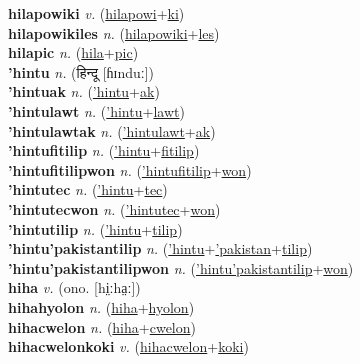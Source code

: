 \textbf{hilapowiki} \textit{v.} (\hyperref[hilapowi]{hilapowi}+\hyperref[ki]{ki})
 \label{hilapowiki} \\
\textbf{hilapowikiles} \textit{n.} (\hyperref[hilapowiki]{hilapowiki}+\hyperref[les]{les})
 \label{hilapowikiles} \\
\textbf{hilapic} \textit{n.} (\hyperref[hila]{hila}+\hyperref[pic]{pic})
 \label{hilapic} \\
\textbf{'hintu} \textit{n.} ({\devanagari{}हिन्दू} [ɦɪnduː])
 \label{'hintu} \\
\textbf{'hintuak} \textit{n.} (\hyperref['hintu]{'hintu}+\hyperref[ak]{ak})
 \label{'hintuak} \\
\textbf{'hintulawt} \textit{n.} (\hyperref['hintu]{'hintu}+\hyperref[lawt]{lawt})
 \label{'hintulawt} \\
\textbf{'hintulawtak} \textit{n.} (\hyperref['hintulawt]{'hintulawt}+\hyperref[ak]{ak})
 \label{'hintulawtak} \\
\textbf{'hintufitilip} \textit{n.} (\hyperref['hintu]{'hintu}+\hyperref[fitilip]{fitilip})
 \label{'hintufitilip} \\
\textbf{'hintufitilipwon} \textit{n.} (\hyperref['hintufitilip]{'hintufitilip}+\hyperref[won]{won})
 \label{'hintufitilipwon} \\
\textbf{'hintutec} \textit{n.} (\hyperref['hintu]{'hintu}+\hyperref[tec]{tec})
 \label{'hintutec} \\
\textbf{'hintutecwon} \textit{n.} (\hyperref['hintutec]{'hintutec}+\hyperref[won]{won})
 \label{'hintutecwon} \\
\textbf{'hintutilip} \textit{n.} (\hyperref['hintu]{'hintu}+\hyperref[tilip]{tilip})
 \label{'hintutilip} \\
\textbf{'hintu'pakistantilip} \textit{n.} (\hyperref['hintu]{'hintu}+\hyperref['pakistan]{'pakistan}+\hyperref[tilip]{tilip})
 \label{'hintu'pakistantilip} \\
\textbf{'hintu'pakistantilipwon} \textit{n.} (\hyperref['hintu'pakistantilip]{'hintu'pakistantilip}+\hyperref[won]{won})
 \label{'hintu'pakistantilipwon} \\
\textbf{hiha} \textit{v.} (ono. [hi̤ːha̤ː])
 \label{hiha} \\
\textbf{hihahyolon} \textit{n.} (\hyperref[hiha]{hiha}+\hyperref[hyolon]{hyolon})
 \label{hihahyolon} \\
\textbf{hihacwelon} \textit{n.} (\hyperref[hiha]{hiha}+\hyperref[cwelon]{cwelon})
 \label{hihacwelon} \\
\textbf{hihacwelonkoki} \textit{v.} (\hyperref[hihacwelon]{hihacwelon}+\hyperref[koki]{koki})
